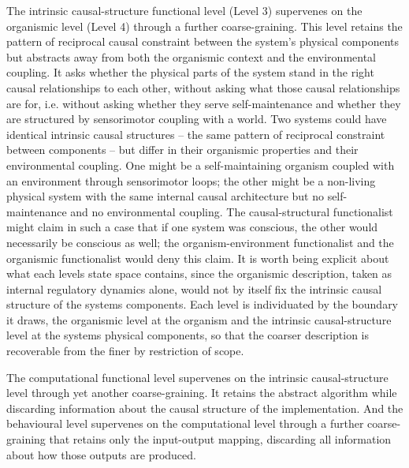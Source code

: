 \documentclass[11pt, a4paper, onecolumn, gdm]{google}
\begin{document}
The intrinsic causal-structure functional level (Level 3) supervenes on the organismic level (Level 4) through a further coarse-graining.
This level retains the pattern of reciprocal causal constraint between the system's physical components but abstracts away from both the organismic context and the environmental coupling.
It asks whether the physical parts of the system stand in the right causal relationships to each other, without asking what those causal relationships are for, i.e. without asking whether they serve self-maintenance and whether they are structured by sensorimotor coupling with a world.
Two systems could have identical intrinsic causal structures -- the same pattern of reciprocal constraint between components -- but differ in their organismic properties and their environmental coupling.
One might be a self-maintaining organism coupled with an environment through sensorimotor loops; the other might be a non-living physical system with the same internal causal architecture but no self-maintenance and no environmental coupling.
The causal-structural functionalist might claim in such a case that if one system was conscious, the other would necessarily be conscious as well; the organism-environment functionalist and the organismic functionalist would deny this claim.
It is worth being explicit about what each level\textquotesingle s state space contains, since the organismic description, taken as internal regulatory dynamics alone, would not by itself fix the intrinsic causal structure of the system\textquotesingle s components.
Each level is individuated by the boundary it draws, the organismic level at the organism and the intrinsic causal-structure level at the system\textquotesingle s physical components, so that the coarser description is recoverable from the finer by restriction of scope.

The computational functional level supervenes on the intrinsic causal-structure level through yet another coarse-graining.
It retains the abstract algorithm while discarding information about the causal structure of the implementation.
And the behavioural level supervenes on the computational level through a further coarse-graining that retains only the input-output mapping, discarding all information about how those outputs are produced.
\end{document}
